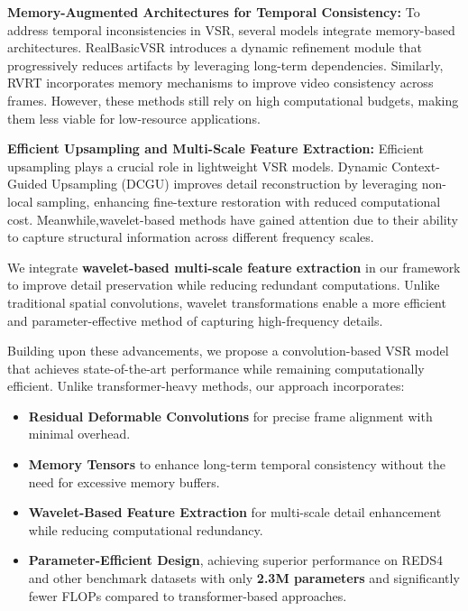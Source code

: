 \documentclass[11pt]{article}
\begin{document}

\textbf{Memory-Augmented Architectures for Temporal Consistency:}  
To address temporal inconsistencies in VSR, several models integrate memory-based architectures. RealBasicVSR \cite{chan2022investigating} introduces a dynamic refinement module that progressively reduces artifacts by leveraging long-term dependencies. Similarly, RVRT \cite{liang2022rvrt} incorporates memory mechanisms to improve video consistency across frames. However, these methods still rely on high computational budgets, making them less viable for low-resource applications.  


\textbf{Efficient Upsampling and Multi-Scale Feature Extraction:}  
Efficient upsampling plays a crucial role in lightweight VSR models. Dynamic Context-Guided Upsampling (DCGU) \cite{huang2024dynamic} improves detail reconstruction by leveraging non-local sampling, enhancing fine-texture restoration with reduced computational cost. Meanwhile,wavelet-based methods have gained attention due to their ability to capture structural information across different frequency scales.  

We integrate \textbf{wavelet-based multi-scale feature extraction} in our framework to improve detail preservation while reducing redundant computations. Unlike traditional spatial convolutions, wavelet transformations enable a more efficient and parameter-effective method of capturing high-frequency details.

Building upon these advancements, we propose a convolution-based VSR model that achieves state-of-the-art performance while remaining computationally efficient. Unlike transformer-heavy methods, our approach incorporates:
\begin{itemize}
    \item \textbf{Residual Deformable Convolutions} for precise frame alignment with minimal overhead.
    \item \textbf{Memory Tensors} to enhance long-term temporal consistency without the need for excessive memory buffers.
    \item \textbf{Wavelet-Based Feature Extraction} for multi-scale detail enhancement while reducing computational redundancy.
    \item \textbf{Parameter-Efficient Design}, achieving superior performance on REDS4 and other benchmark datasets with only \textbf{2.3M parameters} and significantly fewer FLOPs compared to transformer-based approaches.
\end{itemize}
\end{document}

